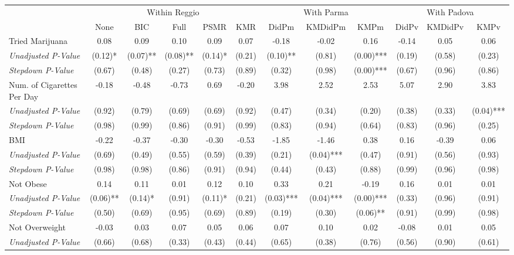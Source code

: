 \begin{tabular}{l c c c c c c c c c c c}
\toprule
& \multicolumn{5}{c}{Within Reggio} & \multicolumn{3}{c}{With Parma} & \multicolumn{3}{c}{With Padova} \\\cmidrule(lr){2-6} \cmidrule(lr){7-9} \cmidrule(lr){10-12}
 & None & BIC & Full & PSMR & KMR & DidPm & KMDidPm & KMPm & DidPv & KMDidPv & KMPv \\
\midrule
Tried Marijuana & 0.08 & 0.09 & 0.10 & 0.09 & 0.07 & -0.18 & -0.02 & 0.16 & -0.14 & 0.05 & 0.06 \\
\quad \textit{Unadjusted P-Value} & (0.12)* & (0.07)** & (0.08)** & (0.14)* & (0.21) & (0.10)** & (0.81) & (0.00)*** & (0.19) & (0.58) & (0.23) \\
\quad \textit{Stepdown P-Value} & (0.67) & (0.48) & (0.27) & (0.73) & (0.89) & (0.32) & (0.98) & (0.00)*** & (0.67) & (0.96) & (0.86) \\
Num. of Cigarettes Per Day & -0.18 & -0.48 & -0.73 & 0.69 & -0.20 & 3.98 & 2.52 & 2.53 & 5.07 & 2.90 & 3.83 \\
\quad \textit{Unadjusted P-Value} & (0.92) & (0.79) & (0.69) & (0.69) & (0.92) & (0.47) & (0.34) & (0.20) & (0.38) & (0.33) & (0.04)*** \\
\quad \textit{Stepdown P-Value} & (0.98) & (0.99) & (0.86) & (0.91) & (0.99) & (0.83) & (0.94) & (0.64) & (0.83) & (0.96) & (0.25) \\
BMI & -0.22 & -0.37 & -0.30 & -0.30 & -0.53 & -1.85 & -1.46 & 0.38 & 0.16 & -0.39 & 0.06 \\
\quad \textit{Unadjusted P-Value} & (0.69) & (0.49) & (0.55) & (0.59) & (0.39) & (0.21) & (0.04)*** & (0.47) & (0.91) & (0.56) & (0.93) \\
\quad \textit{Stepdown P-Value} & (0.98) & (0.98) & (0.86) & (0.91) & (0.94) & (0.44) & (0.43) & (0.88) & (0.99) & (0.96) & (0.98) \\
Not Obese & 0.14 & 0.11 & 0.01 & 0.12 & 0.10 & 0.33 & 0.21 & -0.19 & 0.16 & 0.01 & 0.01 \\
\quad \textit{Unadjusted P-Value} & (0.06)** & (0.14)* & (0.91) & (0.11)* & (0.21) & (0.03)*** & (0.04)*** & (0.00)*** & (0.33) & (0.96) & (0.91) \\
\quad \textit{Stepdown P-Value} & (0.50) & (0.69) & (0.95) & (0.69) & (0.89) & (0.19) & (0.30) & (0.06)** & (0.91) & (0.99) & (0.98) \\
Not Overweight & -0.03 & 0.03 & 0.07 & 0.05 & 0.06 & 0.07 & 0.10 & 0.02 & -0.08 & 0.01 & 0.05 \\
\quad \textit{Unadjusted P-Value} & (0.66) & (0.68) & (0.33) & (0.43) & (0.44) & (0.65) & (0.38) & (0.76) & (0.56) & (0.90) & (0.61) \\

\end{tabular}
